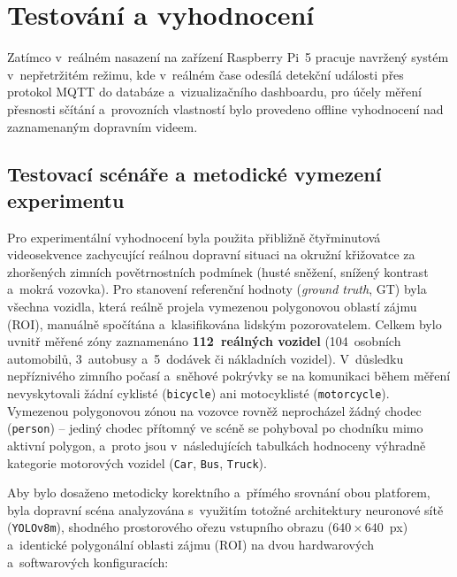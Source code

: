 \chapter{Testování a vyhodnocení}
Zatímco v~reálném nasazení na zařízení Raspberry Pi~5 pracuje navržený systém v~nepřetržitém režimu, kde v~reálném čase odesílá detekční události přes protokol \acs{MQTT} do databáze a~vizualizačního dashboardu, pro účely měření přesnosti sčítání a~provozních vlastností bylo provedeno offline vyhodnocení nad zaznamenaným dopravním videem.

\section{Testovací scénáře a metodické vymezení experimentu}
Pro experimentální vyhodnocení byla použita přibližně čtyřminutová videosekvence zachycující reálnou dopravní situaci na okružní křižovatce za zhoršených zimních povětrnostních podmínek (husté sněžení, snížený kontrast a~mokrá vozovka). Pro stanovení referenční hodnoty (\textit{ground truth}, \acs{GT}) byla všechna vozidla, která reálně projela vymezenou polygonovou oblastí zájmu (\acs{ROI}), manuálně spočítána a~klasifikována lidským pozorovatelem. Celkem bylo uvnitř měřené zóny zaznamenáno \textbf{112~reálných vozidel} (104~osobních automobilů, 3~autobusy a~5~dodávek či nákladních vozidel). V~důsledku nepříznivého zimního počasí a~sněhové pokrývky se na komunikaci během měření nevyskytovali žádní cyklisté (\texttt{bicycle}) ani motocyklisté (\texttt{motorcycle}). Vymezenou polygonovou zónou na vozovce rovněž neprocházel žádný chodec (\texttt{person}) – jediný chodec přítomný ve scéně se pohyboval po chodníku mimo aktivní polygon, a~proto jsou v~následujících tabulkách hodnoceny výhradně kategorie motorových vozidel (\texttt{Car}, \texttt{Bus}, \texttt{Truck}).

Aby bylo dosaženo metodicky korektního a~přímého srovnání obou platforem, byla dopravní scéna analyzována s~využitím totožné architektury neuronové sítě (\texttt{YOLOv8m}), shodného prostorového ořezu vstupního obrazu ($640 \times 640$~px) a~identické polygonální oblasti zájmu (ROI) na dvou hardwarových a~softwarových konfiguracích:

